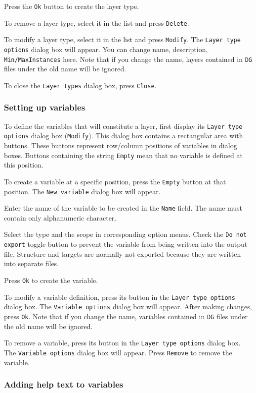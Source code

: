 \documentclass[a4paper,10pt]{report}
\begin{document}
Press the {\tt Ok} button to create the layer type.

To remove a layer type, select it in the list and press {\tt Delete}.

To modify a layer type, select it in the list and press {\tt Modify}.
The {\tt Layer type options} dialog box will appear. You can change
name, description, {\tt Min/MaxInstances} here. Note that if you change the
name, layers contained in {\tt DG} files under the old name will be ignored.

To close the {\tt Layer types} dialog box, press {\tt Close}.

\subsubsection{Setting up variables}

To define the variables that will constitute a layer, first display its
{\tt Layer type options} dialog box ({\tt Modify}). This dialog box contains a
rectangular area with buttons. These buttons represent row/column
positions of variables in dialog boxes. Buttons containing the string
{\tt Empty} mean that no variable is defined at this position.

To create a variable at a specific position, press the {\tt Empty}
button at that position. The {\tt New variable} dialog box will appear.

Enter the name of the variable to be created in the {\tt Name} field. The
name must contain only alphanumeric character.

Select the type and the scope in corresponding option menus. Check the
{\tt Do not export} toggle button to prevent the variable from being
written into the output file. Structure and targets are normally not
exported because they are written into separate files.

Press {\tt Ok} to create the variable.

To modify a variable definition, press its button in the
{\tt Layer type options} dialog box. The {\tt Variable options}
dialog box will
appear. After making changes, press {\tt Ok}. Note that if you change
the name, variables contained in {\tt DG} files under the old name will be
ignored.

To remove a variable, press its button in the
{\tt Layer type options} dialog box. The {\tt Variable options}
dialog box will appear. Press {\tt Remove} to remove the variable.

\subsubsection{Adding help text to variables}
\end{document}
